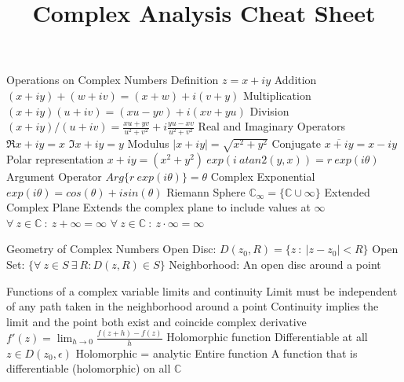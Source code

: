 \documentclass[14pt]{extarticle}
\title{Complex Analysis Cheat Sheet}
\begin{document}
	\maketitle

	
	\begin{outline}		
		\1	Operations on Complex Numbers
			\2	Definition
				\3	$z = x + iy$
			\2	Addition
				\3 $(x + iy) + (w + iv) = (x + w) + i(v + y)$
			\2	Multiplication
				\3	$(x + iy)(u + iv) = (xu - yv) + i(xv + yu)$
			\2	Division
				\3 $(x + iy) / (u + iv) = \frac{xu + yv}{u^2 + v^2} + i\frac{yu - xv}{u^2 + v^2}$
			\2	Real and Imaginary Operators
				\3	$\Re{x + iy} = x$
				\3	$\Im{x + iy} = y$
			\2	Modulus
				\3	$|x + iy| = \sqrt{x^2 + y^2}$
			\2	Conjugate
				\3	$\overline{x + iy} = x - iy$
			\2	Polar representation
				\3	$x + iy = (x^2 + y^2)~exp(i~atan2(y,x)) = r~exp(i \theta)$
			\2	Argument Operator
				\3	$Arg\{r~exp(i \theta)\} = \theta$
		\1	Complex Exponential
			\2	$exp(i \theta) = cos(\theta) + i sin(\theta)$
		\1	Riemann Sphere
			\2	$\mathbb{C}_{\infty} = \{\mathbb{C} \cup \infty\}$
			\2	Extended Complex Plane
				\3	Extends the complex plane to include values at $\infty$
				\3	$\forall~z \in \mathbb{C}~:~z + \infty = \infty$
				\3	$\forall~z \in \mathbb{C}~:~z \cdot \infty = \infty$
		
		\1	Geometry of Complex Numbers
			\2	Open Disc: $D(z_0,R) = \{z~:~|z - z_0| < R\}$
			\2	Open Set: $\{\forall~z \in S~\exists~R : D(z,R) \in S\}$
			\2	Neighborhood:	An open disc around a point
	
		\1	Functions of a complex variable
			\2	limits and continuity
				\3	Limit must be independent of any path taken in the neighborhood around a point
				\3	Continuity implies the limit and the point both exist and coincide
			\2	complex derivative
				\3	$f'(z) = \lim_{h \rightarrow 0} \frac{f(z + h) - f(z)}{h}$
			\2	Holomorphic function
				\3	Differentiable at all $z \in D(z_0,\epsilon)$ 
				\3	Holomorphic = analytic
			\2	Entire function
				\3	A function that is differentiable (holomorphic) on all $\mathbb{C}$
		

\end{outline}
\end{document}

